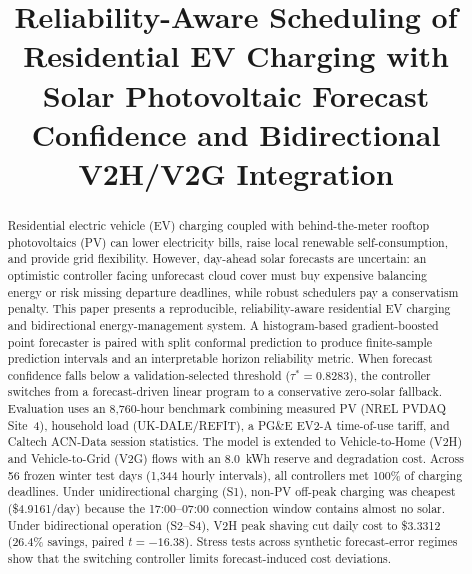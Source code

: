 \documentclass[conference]{IEEEtran}
\begin{document}
\title{Reliability-Aware Scheduling of Residential EV Charging with Solar Photovoltaic Forecast Confidence and Bidirectional V2H/V2G Integration}

\author{
}

\maketitle

\begin{abstract}
Residential electric vehicle (EV) charging coupled with behind-the-meter rooftop photovoltaics (PV) can lower electricity bills, raise local renewable self-consumption, and provide grid flexibility. However, day-ahead solar forecasts are uncertain: an optimistic controller facing unforecast cloud cover must buy expensive balancing energy or risk missing departure deadlines, while robust schedulers pay a conservatism penalty. This paper presents a reproducible, reliability-aware residential EV charging and bidirectional energy-management system. A histogram-based gradient-boosted point forecaster is paired with split conformal prediction to produce finite-sample prediction intervals and an interpretable horizon reliability metric. When forecast confidence falls below a validation-selected threshold ($\tau^* = 0.8283$), the controller switches from a forecast-driven linear program to a conservative zero-solar fallback. Evaluation uses an 8,760-hour benchmark combining measured PV (NREL PVDAQ Site~4), household load (UK-DALE/REFIT), a PG\&E EV2-A time-of-use tariff, and Caltech ACN-Data session statistics. The model is extended to Vehicle-to-Home (V2H) and Vehicle-to-Grid (V2G) flows with an 8.0~kWh reserve and degradation cost. Across 56 frozen winter test days (1,344 hourly intervals), all controllers met 100\% of charging deadlines. Under unidirectional charging (S1), non-PV off-peak charging was cheapest (\$4.9161/day) because the 17:00--07:00 connection window contains almost no solar. Under bidirectional operation (S2--S4), V2H peak shaving cut daily cost to \$3.3312 (26.4\% savings, paired $t=-16.38$). Stress tests across synthetic forecast-error regimes show that the switching controller limits forecast-induced cost deviations.
\end{abstract}
\end{document}
